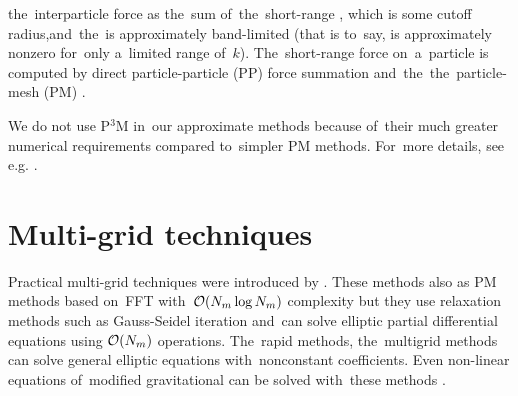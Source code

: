\DIFdelbegin {}\DIFdelend \DIFaddbegin {}\DIFaddend the~interparticle force as the~sum of~\DIFdelbegin {}\DIFdelend the~short-range \DIFdelbegin {}\DIFdelend \DIFaddbegin {}\DIFaddend , which is \DIFdelbegin {}\DIFdelend \DIFaddbegin {}\DIFaddend some cutoff radius,and~the~\DIFdelbegin {}\DIFdelend \DIFaddbegin {}\DIFaddend is approximately band-limited (that is to~say, is approximately nonzero for~only a~limited range of~$k$). The~\DIFdelbegin {}\DIFdelend short-range force on~a~particle is computed by direct particle-particle (PP) \DIFdelbegin {}\DIFdelend force summation and~the~\DIFdelbegin {}\DIFdelend \DIFaddbegin {}\DIFaddend the~particle-mesh (PM) \DIFdelbegin {}\DIFdelend \DIFaddbegin {}\DIFaddend .

We do not use P$^3$M in~our approximate methods because of~their much greater numerical requirements compared to~simpler PM methods. For~more details, see e.g. \textcite{Hockney:1988:CSU:62815}.
\section{Multi-grid techniques}
Practical multi-grid techniques were introduced by \textcite{10.2307/2006422}. These methods also \DIFdelbegin {}\DIFdelend \DIFaddbegin {}\DIFaddend as PM methods based on~FFT with~$\mathcal{O}(N_m\log N_m)$ complexity but they use relaxation methods such as Gauss-Seidel iteration \parencite{doi:10.1002/zamm.19720520813} and~can solve elliptic partial differential equations using $\mathcal{O}(N_m)$ operations. The~\DIFdelbegin {}\DIFdelend \DIFaddbegin {}\DIFaddend rapid methods, \DIFdelbegin {}\DIFdelend \DIFaddbegin {}\DIFaddend the~multigrid methods can \DIFaddbegin {}\DIFaddend solve general elliptic equations with~nonconstant coefficients\DIFdelbegin {}\DIFdelend . Even non-linear equations of~modified gravitational can be solved with~these methods \parencite{10.5555/42249}.

